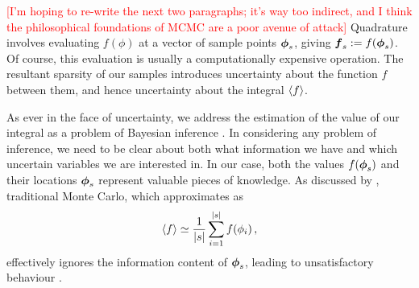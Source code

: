 \documentclass{article}
\begin{document}
\textcolor{red}{[I'm hoping to re-write the next two paragraphs; it's way too indirect, and I think the philosophical foundations of MCMC are a poor avenue of attack]}
Quadrature involves evaluating $f(\phi)$ at a
vector of sample points $\vph_s$, giving $\vf\pha_s\deq
f(\vph_s)$. Of course, this evaluation is usually a computationally expensive
operation.
The resultant sparsity of our samples introduces uncertainty about the function $f$ between them, and hence uncertainty about the integral $\inty{f}$.

As ever in the face of uncertainty, we address the estimation of the value of our integral as a problem of Bayesian inference \citep{BZNumericalAnalysis}. In considering any problem of inference, we need to be clear about both what information we have and which uncertain variables we are interested in. In our case, both the values $f(\vphS)$ and their locations $\vphS$ represent valuable pieces of knowledge. As discussed by \citet{MCUnsound}, traditional Monte Carlo, which approximates as
\begin{equation} \label{eq:MC_integral_estimate}
\inty{f} \simeq \frac{1}{\card{s}} \sum_{i=1}^{\card{s}} f(\phi_i)\,,
\end{equation}
effectively ignores the information content of $\vphS$, leading to unsatisfactory behaviour
.

\end{document}
